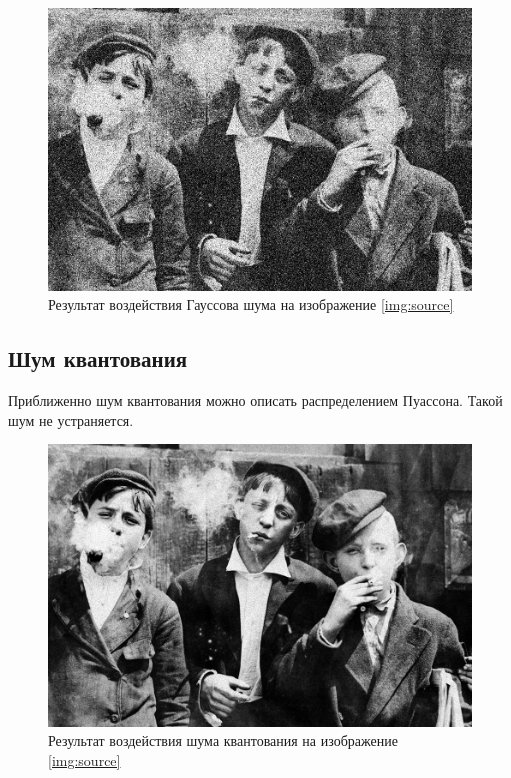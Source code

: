 \begin{figure}[ht!]
    \centering
    \includegraphics[width=\textwidth]{../Noisy_images/Gaussian_noise.jpg}
    \caption{Результат воздействия Гауссова шума на изображение \ref{img:source}}
    \label{img:gaussian_noise}
\end{figure}
\FloatBarrier


\subsection{Шум квантования}
Приближенно шум квантования можно описать распределением Пуассона. Такой шум не устраняется.

\begin{figure}[ht!]
    \centering
    \includegraphics[width=\textwidth]{../Noisy_images/Poisson_Noise.jpg}
    \caption{Результат воздействия шума квантования на изображение \ref{img:source}}
    \label{img:poisson_noise}
\end{figure}
\FloatBarrier

